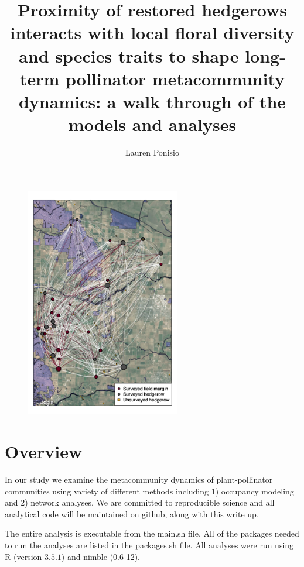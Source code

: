 \documentclass{article}\usepackage[]{graphicx}\usepackage[]{color}
\begin{document}
\title{Proximity of restored hedgerows interacts with local floral diversity and species traits to shape  long-term pollinator metacommunity dynamics: a walk through of the models and analyses}
\author{Lauren Ponisio}


\maketitle

\begin{figure}[h!]
\centering
\includegraphics[width=0.6\textwidth]{figure/degree_spatial.pdf}
\label{fig:network}
\end{figure}
\clearpage

\section{Overview}
In our study we examine the metacommunity dynamics of plant-pollinator
communities using variety of different methods including 1) occupancy
modeling and 2) network analyses.  We are committed to reproducible
science and all analytical code will be maintained on github, along
with this write up.

The entire analysis is executable from the main.sh file. All of the
packages needed to run the analyses are listed in the packages.sh
file. All analyses were run using R (version $3.5.1$)
and nimble (0.6-12). 
\end{document}
